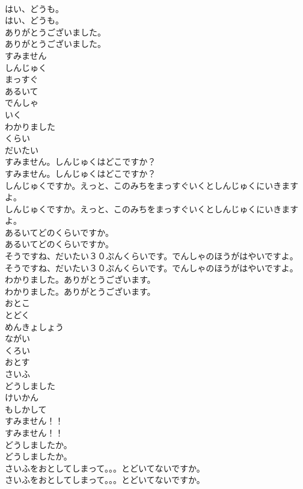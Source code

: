 \documentclass[8pt]{extreport}
\begin{document}
\begin{CJK}{UTF8}{min}
\\	はい、どうも。	
\\	はい、どうも。 
\\	ありがとうございました。	
\\	ありがとうございました。 
\\	すみません
\\	しんじゅく
\\	まっすぐ
\\	あるいて
\\	でんしゃ
\\	いく
\\	わかりました
\\	くらい
\\	だいたい
\\	すみません。しんじゅくはどこですか？	
\\	すみません。しんじゅくはどこですか？ 
\\	しんじゅくですか。えっと、このみちをまっすぐいくとしんじゅくにいきますよ。	
\\	しんじゅくですか。えっと、このみちをまっすぐいくとしんじゅくにいきますよ。 
\\	あるいてどのくらいですか。	
\\	あるいてどのくらいですか。 
\\	そうですね、だいたい３０ぷんくらいです。でんしゃのほうがはやいですよ。	
\\	そうですね、だいたい３０ぷんくらいです。でんしゃのほうがはやいですよ。 
\\	わかりました。ありがとうございます。	
\\	わかりました。ありがとうございます。 
\\	おとこ
\\	とどく
\\	めんきょしょう
\\	ながい
\\	くろい
\\	おとす
\\	さいふ
\\	どうしました
\\	けいかん
\\	もしかして
\\	すみません！！	
\\	すみません！！ 
\\	どうしましたか。	
\\	どうしましたか。 
\\	さいふをおとしてしまって。。。とどいてないですか。	
\\	さいふをおとしてしまって。。。とどいてないですか。 

\end{CJK}
\end{document}
